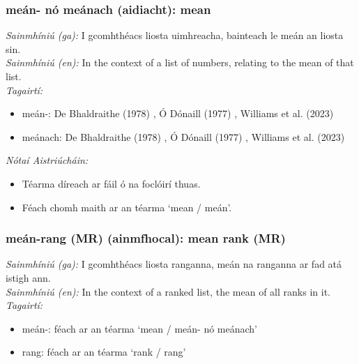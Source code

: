 \subsubsection*{meán- nó meánach (aidiacht): mean}
 \noindent \textit{Sainmhíniú (ga):} I gcomhthéacs liosta uimhreacha, bainteach le meán an liosta sin.
\\
 \noindent \textit{Sainmhíniú (en):} In the context of a list of numbers, relating to the mean of that list.
\\
 \noindent \textit{Tagairtí:}
\begin{itemize}
	\item meán-: De Bhaldraithe (1978) \cite{de-bhaldraithe}, Ó Dónaill (1977) \cite{odonaill}, Williams et al. (2023) \cite{storchiste}
	\item meánach: De Bhaldraithe (1978) \cite{de-bhaldraithe}, Ó Dónaill (1977) \cite{odonaill}, Williams et al. (2023) \cite{storchiste}
\end{itemize}

 \noindent \textit{Nótaí Aistriúcháin:}
\begin{itemize}
	\item Téarma díreach ar fáil ó na foclóirí thuas.
	\item Féach chomh maith ar an téarma `mean / meán'.
\end{itemize}


\subsubsection*{meán-rang (MR) (ainmfhocal): mean rank (MR)}
 \noindent \textit{Sainmhíniú (ga):} I gcomhthéacs liosta ranganna, meán na ranganna ar fad atá istigh ann.
\\
 \noindent \textit{Sainmhíniú (en):} In the context of a ranked list, the mean of all ranks in it.
\\
 \noindent \textit{Tagairtí:}
\begin{itemize}
	\item meán-: féach ar an téarma `mean / meán- nó meánach'
	\item rang: féach ar an téarma `rank / rang'
\end{itemize}

